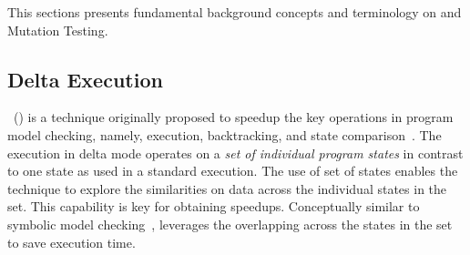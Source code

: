\documentclass{sig-alternate}
\begin{document}
This sections presents fundamental background concepts and terminology
on \dE{} and Mutation Testing.

\subsection{Delta Execution}

\dE{}~(\DE{}) is a technique originally proposed to speedup the key
operations in program model checking, namely, execution, backtracking,
and state comparison~\cite{damorim:issta2007,dAmorimLM08}.  The
execution in delta mode operates on a \emph{set of individual program
  states} in contrast to one state as used in a standard execution.
The use of set of states enables the technique to explore the
similarities on data across the individual states in the set.  This
capability is key for obtaining speedups.  Conceptually similar to
symbolic model checking~\cite{mcmillan93:symbolic}, \dE{} leverages
the overlapping across the states in the set to save execution time.
\end{document}
